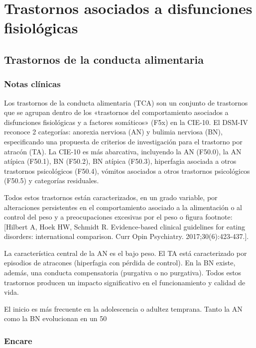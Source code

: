 \documentclass{scrbook}
\begin{document}
\part{Trastornos asociados a disfunciones fisiológicas}
\chapter{Trastornos de la conducta alimentaria}
\section*{Notas clínicas}
Los trastornos de la conducta alimentaria (TCA) son un conjunto de trastornos que se agrupan dentro de los «trastornos del comportamiento asociados a disfunciones fisiológicas y a factores somáticos» (F5x) en la CIE-10. El DSM-IV reconoce 2 categorías: anorexia nerviosa (AN) y bulimia nerviosa (BN), especificando una propuesta de criterios de investigación para el trastorno por atracón (TA). La CIE-10 es más abarcativa, incluyendo la AN (F50.0), la AN atípica (F50.1), BN (F50.2), BN atípica (F50.3), hiperfagia asociada a otros trastornos psicológicos (F50.4), vómitos asociados a otros trastornos psicológicos (F50.5) y categorías residuales.

Todos estos trastornos están caracterizados, en un grado variable, por alteraciones persistentes en el comportamiento asociado a la alimentación o al control del peso y a preocupaciones excesivas por el peso o figura footnote:[Hilbert A, Hoek HW, Schmidt R. Evidence-based clinical guidelines for eating disorders: international comparison. Curr Opin Psychiatry. 2017;30(6):423-437.].

La característica central de la AN es el bajo peso. El TA está caracterizado por episodios de atracones (hiperfagia con pérdida de control). En la BN existe, además, una conducta compensatoria (purgativa o no purgativa). Todos estos trastornos producen un impacto significativo en el funcionamiento y calidad de vida.

El inicio es más frecuente en la adolescencia o adultez temprana. Tanto la AN como la BN evolucionan en un 50%

\section*{Encare}
\end{document}
